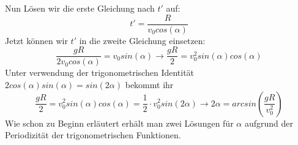 \documentclass[12pt]{article}
\begin{document}
Nun Lösen wir die erste Gleichung nach $t'$ auf:
\begin{equation}
t' = \dfrac{R}{v_0cos(\alpha)}
\end{equation}
Jetzt können wir $t'$ in die zweite Gleichung einsetzen:
\begin{equation}
\dfrac{gR}{2v_0cos(\alpha)} = v_0sin(\alpha) \rightarrow \dfrac{gR}{2} = v_0^2sin(\alpha)cos(\alpha)
\end{equation}
Unter verwendung der trigonometrischen Identität $2cos(\alpha)sin(\alpha) = sin(2\alpha)$ bekommt ihr
\begin{equation}
\dfrac{gR}{2} = v_0^2sin(\alpha)cos(\alpha) = \dfrac{1}{2} \cdot v_0^2sin(2\alpha) \rightarrow 2\alpha = arcsin \left(\dfrac{gR}{v_0^2} \right)
\end{equation}
Wie schon zu Beginn erläutert erhält man zwei Lösungen für $\alpha$ aufgrund der Periodizität der trigonometrischen Funktionen.
\end{document}
